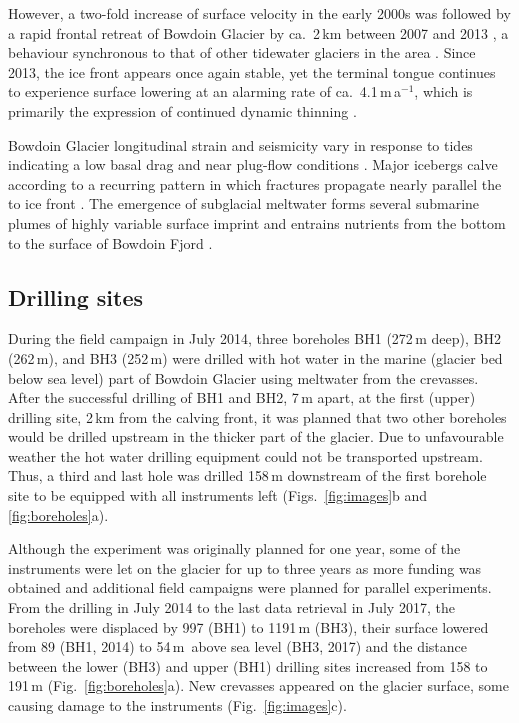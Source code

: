 \documentclass[utf8]{article}
\begin{document}
    However, a two-fold increase of surface velocity in the early 2000s was
    followed by a rapid frontal retreat of Bowdoin Glacier by ca.~2\,km between
    2007 and 2013 \citep[Fig.~2 of][]{Sugiyama.etal.2015}, a behaviour
    synchronous to that of other tidewater glaciers in the area
    \citep{Sakakibara.Sugiyama.2018}. Since 2013, the ice front appears once
    again stable, yet the terminal tongue continues to experience surface
    lowering at an alarming rate of ca.~4.1\,m\,a$^{-1}$, which is primarily
    the expression of continued dynamic thinning \citep{Tsutaki.etal.2016}.

    Bowdoin Glacier longitudinal strain and seismicity vary in response to
    tides~\citep{Podolskiy.etal.2016, Podolskiy.etal.2017} indicating a low
    basal drag and near plug-flow conditions \citep{Seddik.etal.2019}. Major
    icebergs calve according to a recurring pattern in which fractures
    propagate nearly parallel the to ice front \citep{Jouvet.etal.2017}.
    The emergence of subglacial meltwater forms several submarine plumes of
    highly
    variable surface imprint \citep{Jouvet.etal.2018} and entrains nutrients
    from the bottom to the surface of Bowdoin Fjord \citep{Kanna.etal.2018}.


\subsection{Drilling sites}

    During the field campaign in July 2014, three boreholes BH1 (272\,m deep),
    BH2 (262\,m), and BH3 (252\,m) were drilled with hot water in the marine
    (glacier bed below sea level) part of Bowdoin Glacier
    using meltwater from the crevasses. After the successful drilling of BH1
    and BH2, 7\,m apart, at the first (upper) drilling site, 2\,km from the
    calving front, it was planned that two other boreholes would be drilled
    upstream in the thicker part of the glacier. Due to unfavourable weather the
    hot water drilling equipment could not be transported upstream.
    Thus, a third
    and last hole was drilled 158\,m downstream of the first borehole site
    to be equipped with all instruments left (Figs.~\ref{fig:images}b and
    \ref{fig:boreholes}a).

    Although the experiment was originally planned for one year, some of the
    instruments were let on the glacier for up to three years as more funding
    was obtained and additional field campaigns were planned for parallel
    experiments. From the drilling in July 2014 to the last data retrieval in
    July 2017, the boreholes were displaced by 997 (BH1) to 1191\,m (BH3),
    their surface lowered from 89 (BH1, 2014) to 54\,m~above sea level
    (BH3, 2017) and
    the distance between the lower (BH3) and upper (BH1) drilling sites
    increased from 158 to 191\,m (Fig.~\ref{fig:boreholes}a). New crevasses
    appeared on the glacier surface, some causing damage to the instruments
    (Fig.~\ref{fig:images}c).
\end{document}
